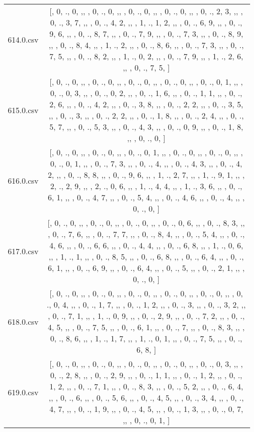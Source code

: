 \begin{table}[ht]
\begin{tabular}{@{}c c@{}}
	614.0.csv & [, 0, ., 0, ,,  , 0, ., 0, ,,  , 0, ., 0, ,,  , 0, ., 0, ,,  , 0, ., 2, 3, ,,  , 0, ., 3, 7, ,,  , 0, ., 4, 2, ,,  , 1, ., 1, 2, ,,  , 0, ., 6, 9, ,,  , 0, ., 9, 6, ,,  , 0, ., 8, 7, ,,  , 0, ., 7, 9, ,,  , 0, ., 7, 3, ,,  , 0, ., 8, 9, ,,  , 0, ., 8, 4, ,,  , 1, ., 2, ,,  , 0, ., 8, 6, ,,  , 0, ., 7, 3, ,,  , 0, ., 7, 5, ,,  , 0, ., 8, 2, ,,  , 1, ., 0, 2, ,,  , 0, ., 7, 9, ,,  , 1, ., 2, 6, ,,  , 0, ., 7, 5, ]\\ 
	615.0.csv & [, 0, ., 0, ,,  , 0, ., 0, ,,  , 0, ., 0, ,,  , 0, ., 0, ,,  , 0, ., 0, 1, ,,  , 0, ., 0, 3, ,,  , 0, ., 0, 2, ,,  , 0, ., 1, 6, ,,  , 0, ., 1, 1, ,,  , 0, ., 2, 6, ,,  , 0, ., 4, 2, ,,  , 0, ., 3, 8, ,,  , 0, ., 2, 2, ,,  , 0, ., 3, 5, ,,  , 0, ., 3, ,,  , 0, ., 2, 2, ,,  , 0, ., 1, 8, ,,  , 0, ., 2, 4, ,,  , 0, ., 5, 7, ,,  , 0, ., 5, 3, ,,  , 0, ., 4, 3, ,,  , 0, ., 0, 9, ,,  , 0, ., 1, 8, ,,  , 0, ., 0, ]\\ 
	616.0.csv & [, 0, ., 0, ,,  , 0, ., 0, ,,  , 0, ., 0, 1, ,,  , 0, ., 0, ,,  , 0, ., 0, ,,  , 0, ., 0, 1, ,,  , 0, ., 7, 3, ,,  , 0, ., 4, ,,  , 0, ., 4, 3, ,,  , 0, ., 4, 2, ,,  , 0, ., 8, 8, ,,  , 0, ., 9, 6, ,,  , 1, ., 2, 7, ,,  , 1, ., 9, 1, ,,  , 2, ., 2, 9, ,,  , 2, ., 0, 6, ,,  , 1, ., 4, 4, ,,  , 1, ., 3, 6, ,,  , 0, ., 6, 1, ,,  , 0, ., 4, 7, ,,  , 0, ., 5, 4, ,,  , 0, ., 4, 6, ,,  , 0, ., 4, ,,  , 0, ., 0, ]\\ 
	617.0.csv & [, 0, ., 0, ,,  , 0, ., 0, ,,  , 0, ., 0, ,,  , 0, ., 0, 6, ,,  , 0, ., 8, 3, ,,  , 0, ., 7, 6, ,,  , 0, ., 7, 7, ,,  , 0, ., 8, 4, ,,  , 0, ., 5, 4, ,,  , 0, ., 4, 6, ,,  , 0, ., 6, 6, ,,  , 0, ., 4, 4, ,,  , 0, ., 6, 8, ,,  , 1, ., 0, 6, ,,  , 1, ., 1, ,,  , 0, ., 8, 5, ,,  , 0, ., 6, 8, ,,  , 0, ., 6, 4, ,,  , 0, ., 6, 1, ,,  , 0, ., 6, 9, ,,  , 0, ., 6, 4, ,,  , 0, ., 5, ,,  , 0, ., 2, 1, ,,  , 0, ., 0, ]\\ 
	618.0.csv & [, 0, ., 0, ,,  , 0, ., 0, ,,  , 0, ., 0, ,,  , 0, ., 0, ,,  , 0, ., 0, ,,  , 0, ., 0, 4, ,,  , 0, ., 1, 7, ,,  , 0, ., 1, 2, ,,  , 0, ., 3, ,,  , 0, ., 3, 2, ,,  , 0, ., 7, 1, ,,  , 1, ., 0, 9, ,,  , 0, ., 2, 9, ,,  , 0, ., 7, 2, ,,  , 0, ., 4, 5, ,,  , 0, ., 7, 5, ,,  , 0, ., 6, 1, ,,  , 0, ., 7, ,,  , 0, ., 8, 3, ,,  , 0, ., 8, 6, ,,  , 1, ., 1, 7, ,,  , 1, ., 0, 1, ,,  , 0, ., 7, 5, ,,  , 0, ., 6, 8, ]\\ 
	619.0.csv & [, 0, ., 0, ,,  , 0, ., 0, ,,  , 0, ., 0, ,,  , 0, ., 0, ,,  , 0, ., 0, 3, ,,  , 0, ., 2, 8, ,,  , 0, ., 2, 9, ,,  , 0, ., 1, 1, ,,  , 0, ., 1, 2, ,,  , 0, ., 1, 2, ,,  , 0, ., 7, 1, ,,  , 0, ., 8, 3, ,,  , 0, ., 5, 2, ,,  , 0, ., 6, 4, ,,  , 0, ., 6, ,,  , 0, ., 5, 6, ,,  , 0, ., 4, 5, ,,  , 0, ., 3, 4, ,,  , 0, ., 4, 7, ,,  , 0, ., 1, 9, ,,  , 0, ., 4, 5, ,,  , 0, ., 1, 3, ,,  , 0, ., 0, 7, ,,  , 0, ., 0, 1, ]\\ 

\end{tabular}
\end{table}
